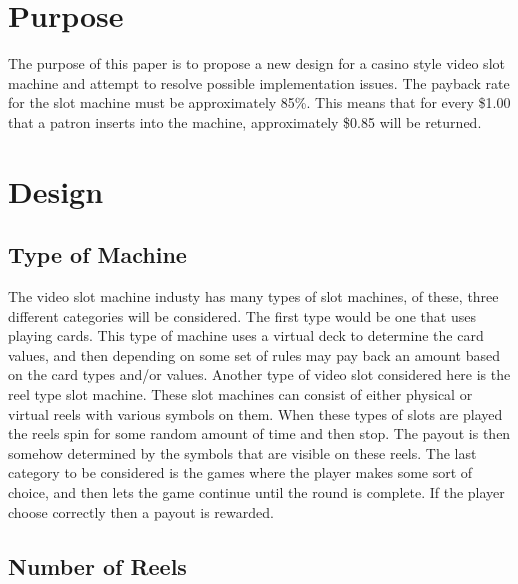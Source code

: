 
\section{Purpose}

The purpose of this paper is to propose a new design for a casino style video slot machine and
attempt to resolve possible implementation issues.  The payback rate for the slot machine must
be approximately 85\%.  This means that for every \$1.00 that a patron inserts into the machine,
approximately \$0.85 will be returned.


\section{Design}
\subsection{Type of Machine}

  The video slot machine industy has many types of slot machines, of these, three different
categories will be considered.  The first type would be one that uses playing cards.  This type
of machine uses a virtual deck to determine the card values, and then depending on some set of
rules may pay back an amount based on the card types and/or values.  Another type of video slot
considered here is the reel type slot machine.  These slot machines can consist of either
physical or virtual reels with various symbols on them.  When these types of slots are played
the reels spin for some random amount of time and then stop.  The payout is then somehow
determined by the symbols that are visible on these reels.  The last category to be considered
is the games where the player makes some sort of choice, and then lets the game continue until
the round is complete.  If the player choose correctly then a payout is rewarded.

\subsection{Number of Reels}

